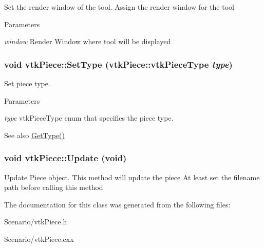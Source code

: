 Set the render window of the tool. Assign the render window for the tool 
\begin{DoxyParams}{Parameters}
\item[{\em window}]Render Window where tool will be displayed \end{DoxyParams}
\hypertarget{classvtkPiece_a19bed21306aacd30f7890ff6d364d025}{
\subsubsection[{SetType}]{\setlength{\rightskip}{0pt plus 5cm}void vtkPiece::SetType ({\bf vtkPiece::vtkPieceType} {\em type})}}
\label{classvtkPiece_a19bed21306aacd30f7890ff6d364d025}


Set piece type. 
\begin{DoxyParams}{Parameters}
\item[{\em type}]vtkPieceType enum that specifies the piece type. \end{DoxyParams}
\begin{DoxySeeAlso}{See also}
\hyperlink{classvtkPiece_a337c7aa8f4c6a65cee2f436eedc29038}{GetType()} 
\end{DoxySeeAlso}
\hypertarget{classvtkPiece_ac27cfcc5591305b572274c7f1d422fe8}{
\subsubsection[{Update}]{\setlength{\rightskip}{0pt plus 5cm}void vtkPiece::Update (void)}}
\label{classvtkPiece_ac27cfcc5591305b572274c7f1d422fe8}


Update Piece object. This method will update the piece At least set the filename path before calling this method 

The documentation for this class was generated from the following files:\begin{DoxyCompactItemize}
\item 
Scenario/vtkPiece.h\item 
Scenario/vtkPiece.cxx\end{DoxyCompactItemize}

